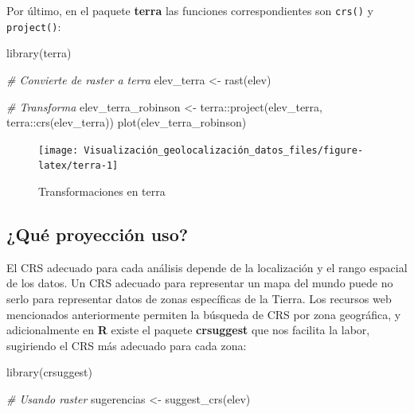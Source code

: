 \documentclass[
]{book}
\newenvironment{Shaded}{\begin{snugshade}}{\end{snugshade}}
\newcommand{\CommentTok}[1]{\textcolor[rgb]{0.56,0.35,0.01}{\textit{#1}}}
\newcommand{\FunctionTok}[1]{\textcolor[rgb]{0.00,0.00,0.00}{#1}}
\newcommand{\NormalTok}[1]{#1}
\newcommand{\OtherTok}[1]{\textcolor[rgb]{0.56,0.35,0.01}{#1}}
\newcommand{\SpecialCharTok}[1]{\textcolor[rgb]{0.00,0.00,0.00}{#1}}
\theoremstyle{definition}
\theoremstyle{definition}
\theoremstyle{definition}
\theoremstyle{definition}
\theoremstyle{remark}
\begin{document}
Por último, en el paquete \textbf{terra} \citep{R-terra} las funciones correspondientes
son \texttt{crs()} y \texttt{project()}:

\begin{Shaded}
\begin{Highlighting}[]
\FunctionTok{library}\NormalTok{(terra)}

\CommentTok{\# Convierte de raster a terra}
\NormalTok{elev\_terra }\OtherTok{\textless{}{-}} \FunctionTok{rast}\NormalTok{(elev)}


\CommentTok{\# Transforma}
\NormalTok{elev\_terra\_robinson }\OtherTok{\textless{}{-}}\NormalTok{ terra}\SpecialCharTok{::}\FunctionTok{project}\NormalTok{(elev\_terra, terra}\SpecialCharTok{::}\FunctionTok{crs}\NormalTok{(elev\_terra))}
\FunctionTok{plot}\NormalTok{(elev\_terra\_robinson)}
\end{Highlighting}
\end{Shaded}

\begin{figure}

{\centering \texttt{[image: Visualización\_geolocalización\_datos\_files/figure-latex/terra-1]} 

}

\caption{Transformaciones en terra}\label{fig:terra}
\end{figure}

\hypertarget{quecrsuso}{%
\subsection{¿Qué proyección uso?}\label{quecrsuso}}

El CRS adecuado para cada análisis depende de la localización y el rango
espacial de los datos. Un CRS adecuado para representar un mapa del mundo puede
no serlo para representar datos de zonas específicas de la Tierra. Los recursos
web mencionados anteriormente permiten la búsqueda de CRS por zona geográfica, y
adicionalmente en \textbf{R} existe el paquete \textbf{crsuggest} \citep{R-crsuggest} que nos
facilita la labor, sugiriendo el CRS más adecuado para cada zona:

\begin{Shaded}
\begin{Highlighting}[]
\FunctionTok{library}\NormalTok{(crsuggest)}

\CommentTok{\# Usando raster}
\NormalTok{sugerencias }\OtherTok{\textless{}{-}} \FunctionTok{suggest\_crs}\NormalTok{(elev)}
\end{Highlighting}
\end{Shaded}
\end{document}
